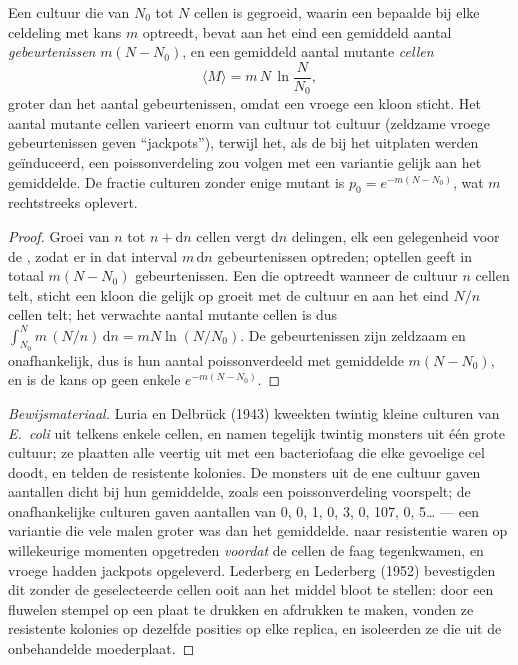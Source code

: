 \begin{theorem}\label{thm:b2:genome-diversification:luria}
Een cultuur die van $N_0$ tot $N$ cellen is gegroeid, waarin een
bepaalde  bij elke celdeling met kans $m$ optreedt, bevat aan het
eind een gemiddeld aantal \emph{gebeurtenissen} $m(N - N_0)$, en
een gemiddeld aantal mutante \emph{cellen}
\[
\langle M\rangle = m\,N\,\ln\frac{N}{N_0},
\]
groter dan het aantal gebeurtenissen, omdat een vroege  een kloon
sticht. Het aantal mutante cellen varieert enorm van cultuur tot cultuur
(zeldzame vroege gebeurtenissen geven ``jackpots''), terwijl het, als de
 bij het uitplaten werden geïnduceerd, een poissonverdeling zou
volgen met een variantie gelijk aan het gemiddelde. De fractie culturen
zonder enige mutant is $p_0 = e^{-m(N - N_0)}$, wat $m$ rechtstreeks
oplevert.
\end{theorem}
\begin{proof}
Groei van $n$ tot $n + \mathrm{d}n$ cellen vergt $\mathrm{d}n$
delingen, elk een gelegenheid voor de , zodat er in dat interval
$m\,\mathrm{d}n$ gebeurtenissen optreden; optellen geeft in totaal
$m(N - N_0)$ gebeurtenissen. Een  die optreedt wanneer de cultuur
$n$ cellen telt, sticht een kloon die gelijk op groeit met de cultuur en
aan het eind $N/n$ cellen telt; het verwachte aantal mutante cellen is
dus $\int_{N_0}^{N} m\,(N/n)\,\mathrm{d}n = mN\ln(N/N_0)$. De
gebeurtenissen zijn zeldzaam en onafhankelijk, dus is hun aantal
poissonverdeeld met gemiddelde $m(N - N_0)$, en is de kans op geen
enkele $e^{-m(N - N_0)}$.
\end{proof}
\begin{proof}[Bewijsmateriaal]
Luria en Delbrück (1943) kweekten twintig kleine culturen van
\emph{E.~coli} uit telkens enkele cellen, en namen tegelijk twintig
monsters uit één grote cultuur; ze plaatten alle veertig uit met een
bacteriofaag die elke gevoelige cel doodt, en telden de resistente
kolonies. De monsters uit de ene cultuur gaven aantallen dicht bij hun
gemiddelde, zoals een poissonverdeling voorspelt; de onafhankelijke
culturen gaven aantallen van 0, 0, 1, 0, 3, 0, 107, 0, 5\dots{} --- een
variantie die vele malen groter was dan het gemiddelde.  naar
resistentie waren op willekeurige momenten opgetreden \emph{voordat} de
cellen de faag tegenkwamen, en vroege  hadden jackpots
opgeleverd. Lederberg en Lederberg (1952) bevestigden dit zonder de
geselecteerde cellen ooit aan het middel bloot te stellen: door een
fluwelen stempel op een plaat te drukken en afdrukken te maken, vonden
ze resistente kolonies op dezelfde posities op elke replica, en
isoleerden ze die uit de onbehandelde moederplaat.
\end{proof}

